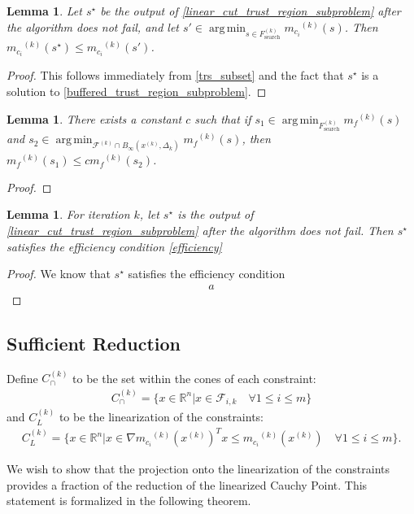 \documentclass{article}
\newtheorem{lemma}[theorem]{Lemma}
\theoremstyle{case}
\newcommand{\xk}{{x^{(k)}}}
\newcommand{\Rn}{\mathbb R^n}
\newcommand{\dk}{\Delta_k}
\newcommand{\mfk}{{{m}_f}^{(k)}}
\newcommand{\mcik}{{{m}_{c_i}}^{(k)}}
\newcommand{\feasiblek}{{\mathcal F^{(k)}}}
\DeclareMathOperator*{\argmin}{arg\,min}
\newcommand{\fik}{{\mathcal F_{i, k}}}
\newcommand{\trsfesset}{{F^{(k)}_\text{search}}}
\newcommand{\capcones}{{C^{(k)}_{\cap}}}
\newcommand{\linearization}{{C^{(k)}_{L}}}
\newcommand{\tr}{{ B_{\infty}\left(\xk, \dk\right) }}
\begin{document}
\begin{lemma}
Let $s^{\star}$ be the output of \cref{linear_cut_trust_region_subproblem} after the algorithm does not fail, and let $s'  \in \argmin_{s \in \trsfesset} \mcik(s)$.
Then $\mcik(s^{\star}) \le \mcik(s')$.
\end{lemma}
\begin{proof}
This follows immediately from \cref{trs_subset} and the fact that $s^{\star}$ is a solution to \cref{buffered_trust_region_subproblem}.
\end{proof}

\begin{lemma}
There exists a constant $c$ such that if $s_1 \in \argmin_{\trsfesset}\mfk(s)$ and $s_2 \in \argmin_{\feasiblek \cap \tr} \mfk(s)$, then $\mfk(s_1) \le c \mfk(s_2)$.
\end{lemma}

\begin{proof}

\end{proof}

\begin{lemma}
For iteration $k$, let $s^{\star}$ is the output of \cref{linear_cut_trust_region_subproblem} after the algorithm does not fail.
Then $s^{\star}$ satisfies the efficiency condition \cref{efficiency}
\end{lemma}

\begin{proof}
We know that $s^{\star}$ satisfies the efficiency condition
\begin{align*}
a
\end{align*}
\end{proof}


\subsection{Sufficient Reduction}


Define $\capcones$ to be the set within the cones of each constraint:
\begin{align}
\label{definecapcones}
\capcones = \{x\in\Rn | x \in \fik \quad \forall 1 \le i \le m \} 
\end{align}
and $\linearization$ to be the linearization of the constraints:
\begin{align}
\linearization = \{x \in\Rn | x \in \nabla \mcik(\xk)^Tx \le \mcik(\xk) \quad \forall 1\le i\le m\}.
\end{align}

We wish to show that the projection onto the linearization of the constraints provides a fraction of the reduction of the linearized Cauchy Point.
This statement is formalized in the following theorem.
\end{document}
